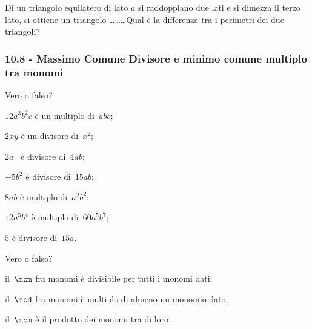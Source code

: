 \begin{esercizio}[\Ast]
 \label{ese:10.43} %
Di un triangolo equilatero di lato $ a $ si raddoppiano due lati e si dimezza il terzo lato, si ottiene un triangolo \ldots\ldots\ldots Qual è la differenza tra i perimetri dei due triangoli?
\end{esercizio}

\subsubsection*{10.8 - Massimo Comune Divisore e minimo comune multiplo tra monomi}

\begin{esercizio}
 \label{ese:10.44} %
Vero o falso?

\begin{multicols}{2}
\begin{enumeratea}
\item $12a^{3}b^{2}c$ è un multiplo di~$abc$; %
\item $2xy$ è un divisore di~$x^{2}$; %
\item $2a$ \ è divisore di~$4ab$; %
\item $-5b^{2}$ è divisore di~$15ab$; %
\item $8ab$ è multiplo di~$a^{2}b^{2}$; %
\item $12a^{5}b^{4}$ è multiplo di~$60a^{5}b^{7}$; %
\item $5$ è divisore di~$15a$. %
\end{enumeratea}
\end{multicols}
\end{esercizio}
\begin{esercizio}
 \label{ese:10.45} %
Vero o falso?

\begin{enumeratea}
\item il~$\mcm$ fra monomi è divisibile per tutti i monomi dati; %
\item il~$\mcd$ fra monomi è multiplo di almeno un monomio dato; %
\item il~$\mcm$ è il prodotto dei monomi tra di loro. %
\end{enumeratea}
\end{esercizio}

